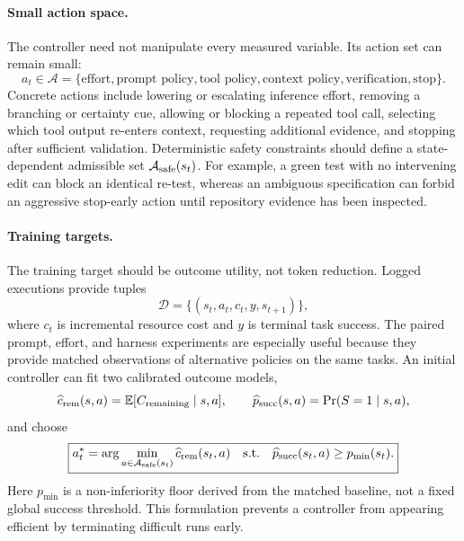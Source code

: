 \documentclass[11pt]{article}
\begin{document}
\paragraph{Small action space.}
The controller need not manipulate every measured variable. Its action set can
remain small:
\[
a_t\in\mathcal{A}=\{\text{effort},\text{prompt policy},\text{tool policy},
\text{context policy},\text{verification},\text{stop}\}.
\]
Concrete actions include lowering or escalating inference effort, removing a
branching or certainty cue, allowing or blocking a repeated tool call,
selecting which tool output re-enters context, requesting additional evidence,
and stopping after sufficient validation. Deterministic safety constraints
should define a state-dependent admissible set $\mathcal{A}_{\rm safe}(s_t)$.
For example, a green test with no intervening edit can block an identical
re-test, whereas an ambiguous specification can forbid an aggressive
stop-early action until repository evidence has been inspected.

\paragraph{Training targets.}
The training target should be outcome utility, not token reduction. Logged
executions provide tuples
\[
\mathcal{D}=\{(s_t,a_t,c_t,y,s_{t+1})\},
\]
where $c_t$ is incremental resource cost and $y$ is terminal task success. The
paired prompt, effort, and harness experiments are especially useful because
they provide matched observations of alternative policies on the same tasks.
An initial controller can fit two calibrated outcome models,
\[
\widehat c_{\rm rem}(s,a)=\mathbb{E}[C_{\rm remaining}\mid s,a],
\qquad
\widehat p_{\rm succ}(s,a)=\Pr(S=1\mid s,a),
\]
and choose
\[
\boxed{
a_t^*=\arg\min_{a\in\mathcal{A}_{\rm safe}(s_t)}
\widehat c_{\rm rem}(s_t,a)
\quad\text{s.t.}\quad
\widehat p_{\rm succ}(s_t,a)\geq p_{\min}(s_t).
}
\]
Here $p_{\min}$ is a non-inferiority floor derived from the matched baseline,
not a fixed global success threshold. This formulation prevents a controller
from appearing efficient by terminating difficult runs early.
\end{document}
